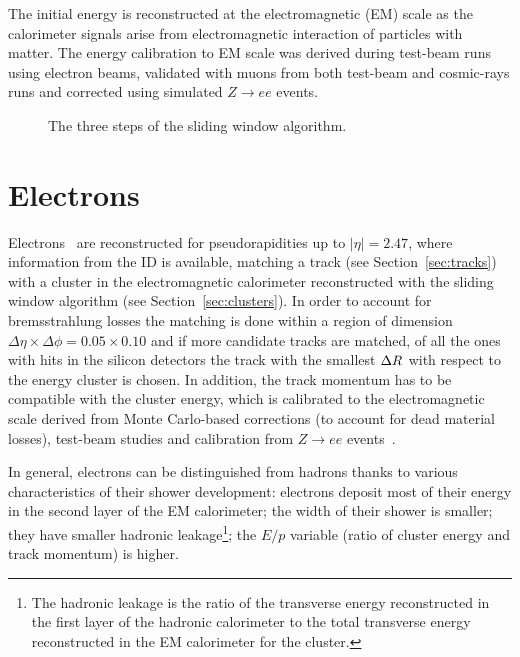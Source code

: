 The initial energy is reconstructed at the electromagnetic (EM) scale as
the calorimeter signals arise from electromagnetic interaction of
particles with matter. The energy calibration to EM scale was derived
during test-beam runs using electron beams, validated with muons
from both test-beam and cosmic-rays runs and corrected using simulated $Z\to ee$ events.

\begin{figure}[tb]\begin{center}
	\caption{The three steps of the sliding window algorithm.
	\label{fig:sliding}}
\end{center}\end{figure}

\section{Electrons}\label{sec:electrons}

Electrons~\cite{eperf} are reconstructed for pseudorapidities up to $|\eta| = 2.47$, where
information from the ID is available, matching a track (see Section~\ref{sec:tracks}) 
with a cluster in the electromagnetic calorimeter reconstructed with the sliding window 
algorithm (see Section~\ref{sec:clusters}).
In order to account for bremsstrahlung losses the matching is done within a region
of dimension $\Delta\eta\times\Delta\phi=0.05\times0.10$ and if more candidate
tracks are matched, of all the ones with hits in the silicon detectors
the track with the smallest $\dr$ with respect to the
energy cluster is chosen. In addition, the track momentum has to be compatible
with the cluster energy, which is calibrated to the electromagnetic scale
derived from Monte Carlo-based corrections (to account for dead material losses),
test-beam studies and calibration from $Z\to ee$ events~\cite{Abat:1900zz}.

In general, electrons can be distinguished from hadrons thanks to various characteristics
of their shower development: electrons deposit most of their energy in the second layer of
the EM calorimeter; the width of their shower is smaller; they have smaller
hadronic leakage\footnote{The hadronic leakage is the ratio of the transverse energy reconstructed
in the first layer of the hadronic calorimeter to the total  transverse energy reconstructed in the 
EM calorimeter for the cluster.}; the $E/p$ variable (ratio of cluster energy and track momentum) is higher.

